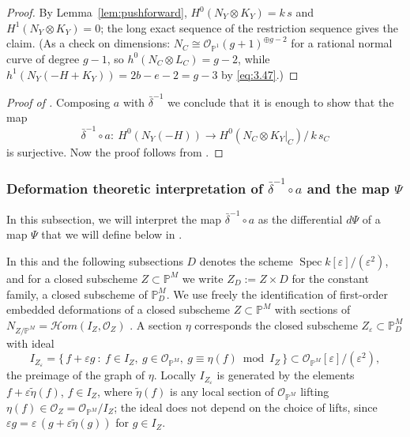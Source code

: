 \documentclass[11pt,twoside]{amsart}
\theoremstyle{plain}
\theoremstyle{definition}
\newcommand{\PP}{\mathbb{P}}
\newcommand{\PM}{\mathbb{P}^M}
\newcommand{\OO}{\mathcal{O}}
\newcommand{\sHom}{\mathcal{H}om}
\newcommand{\NY}{N_{Y}}
\newcommand{\Dd}{D}
\begin{document}
\begin{proof}
By Lemma~\ref{lem:pushforward}, $H^0(\NY\otimes K_Y)=k\,s$ and $H^1(\NY\otimes K_Y)=0$; the long exact sequence of the restriction sequence gives the claim. (As a check on dimensions: $N_C\cong\OO_{\PP^1}(g+1)^{\oplus g-2}$ for a rational normal curve of degree $g-1$, so $h^0(N_C\otimes L_C)=g-2$, while $h^1(\NY(-H+K_Y))=2b-e-2=g-3$ by \eqref{eq:3.47}.)
\end{proof}



\begin{proof}[Proof of ]
Composing $a$ with $\bar\delta^{-1}$ we conclude that it is enough to show that the map
\begin{equation}\label{eq:themap}
\bar\delta^{-1}\circ a\colon\ H^0(\NY(-H))\longrightarrow H^0(N_C\otimes K_Y|_C)\big/\,k\,s_C
\end{equation}
is surjective. Now the proof follows from .   
\end{proof}


\subsubsection{Deformation theoretic interpretation of $\bar\delta^{-1}\circ a$ and the map $\Psi$}\label{subsec:geometric}

In this subsection, we will interpret the map $\bar\delta^{-1}\circ a$ as the differential $d\Psi$ of a map $\Psi$ that we will define below in . \par
In this and the following subsections $\Dd$ denotes the scheme $\operatorname{Spec}k[\varepsilon]/(\varepsilon^2)$, and for a closed subscheme $Z\subset\PM$ we write $Z_\Dd:=Z\times\Dd$ for the constant family, a closed subscheme of $\PM_\Dd$. We use freely the identification of first-order embedded deformations of a closed subscheme $Z\subset\PM$ with sections of $N_{Z/\PM}=\sHom(I_Z,\OO_Z)$ \cite[\S3.2]{Ser06}. A section $\eta$ corresponds the closed subscheme $Z_\varepsilon\subset\PM_\Dd$ with ideal
\[
I_{Z_\varepsilon}=\{\,f+\varepsilon g\ :\ f\in I_Z,\ g\in\OO_{\PM},\ g\equiv\eta(f)\bmod I_Z\,\}\subset\OO_{\PM}[\varepsilon]/(\varepsilon^2),
\]
the preimage of the graph of $\eta$. Locally $I_{Z_\varepsilon}$ is generated by the elements $f+\varepsilon\tilde\eta(f)$, $f\in I_Z$, where $\tilde\eta(f)$ is any local section of $\OO_{\PM}$ lifting $\eta(f)\in\OO_Z=\OO_{\PM}/I_Z$; the ideal does not depend on the choice of lifts, since $\varepsilon g=\varepsilon\,(g+\varepsilon\tilde\eta(g))$ for $g\in I_Z$.
\end{document}
